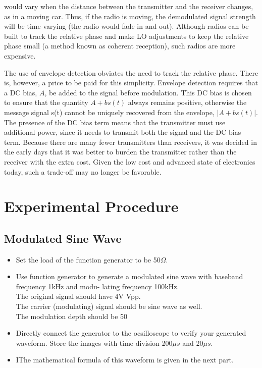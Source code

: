 \documentclass[12pt]{article}
\begin{document}
would vary when the distance between the transmitter and the receiver changes, as in a moving car. Thus,
if the radio is moving, the demodulated signal strength will be time-varying (the radio would fade in and
out). Although radios can be built to track the relative phase and make LO adjustments to keep the relative
phase small (a method known as coherent reception), such radios are more expensive.
\par The use of envelope detection obviates the need to track the relative phase. There is, however, a price to
be paid for this simplicity. Envelope detection requires that a DC bias, $A$, be added to the signal before
modulation. This DC bias is chosen to ensure that the quantity $A+bs(t)$ always remains positive, otherwise
the message signal s(t) cannot be uniquely recovered from the envelope, $|A+bs(t)|$. The presence of the DC
bias term means that the transmitter must use additional power, since it needs to transmit both the signal
and the DC bias term. Because there are many fewer transmitters than receivers, it was decided in the early
days that it was better to burden the transmitter rather than the receiver with the extra cost. Given the
low cost and advanced state of electronics today, such a trade-off may no longer be favorable.
\section{Experimental Procedure}
\subsection{Modulated Sine Wave}
\begin{itemize}
\item Set the load of the function generator to be 50$\Omega$.
\item Use function generator to generate a modulated sine wave with baseband frequency 1kHz and modu-
lating frequency 100kHz.
\\The original signal should have 4V Vpp.
\\The carrier (modulating) signal should be sine wave as well.
\\The modulation depth should be 50%
\item Directly connect the generator to the ocsilloscope to verify your generated waveform. Store the images
with time division 200$\mu s$ and 20$\mu s$.
\item IThe mathematical formula of this waveform is given in the next part.
\end{itemize}
\end{document}
